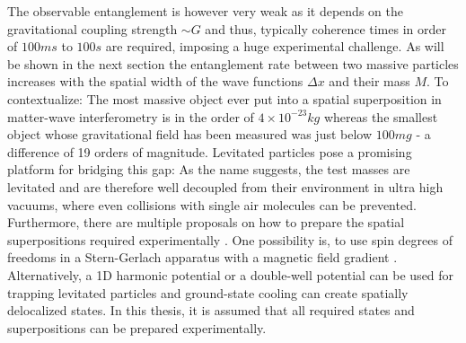 The observable entanglement is however very weak as it depends on the gravitational coupling strength $\sim G$ and thus, typically coherence times in order of $100\si{ms}$ to $100\si{s}$ are required, imposing a huge experimental challenge.
As will be shown in the next section the entanglement rate between two massive particles increases with the spatial width of the wave functions $\Delta x$ and their mass $M$.
To contextualize: The most massive object ever put into a spatial superposition in matter-wave interferometry is in the order of $4\times 10^{-23}\si{kg}$ \cite{Fein_2019} whereas the smallest object whose gravitational field has been measured was just below $100\si{mg}$ \cite{Westphal_2021} - a difference of 19 orders of magnitude.
Levitated particles pose a promising platform for bridging this gap: As the name suggests, the test masses are levitated and are therefore well decoupled from their environment in ultra high vacuums, where even collisions with single air molecules can be prevented.
Furthermore, there are multiple proposals on how to prepare the spatial superpositions required experimentally \cite{Bose_2017,Krisnanda_2020,Marletto_2017}.
One possibility is, to use spin degrees of freedoms in a Stern-Gerlach apparatus with a magnetic field gradient \cite{Bose_2017}.
Alternatively, a 1D harmonic potential \cite{Krisnanda_2020} or a double-well potential can be used for trapping levitated particles and ground-state cooling can create spatially delocalized states.
In this thesis, it is assumed that all required states and superpositions can be prepared experimentally.


